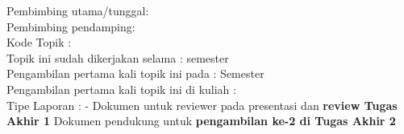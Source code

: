 Pembimbing utama/tunggal: {\bf \pembA}\\
Pembimbing pendamping: {\bf \pembB}\\
Kode Topik : {\bf \kodetopik}\\
Topik ini sudah dikerjakan selama : {\bf \lamaSkripsi} semester\\
Pengambilan pertama kali topik ini pada : Semester {\bf \semesterPertama} \\
Pengambilan pertama kali topik ini di kuliah : {\bf \kulPertama} \\
Tipe Laporan : {\bf \tipePR} -
		{
		 {
				Dokumen untuk reviewer pada presentasi dan {\bf review Tugas Akhir 1}}
			{	Dokumen pendukung untuk {\bf pengambilan ke-2 di Tugas Akhir 2}}
		}
